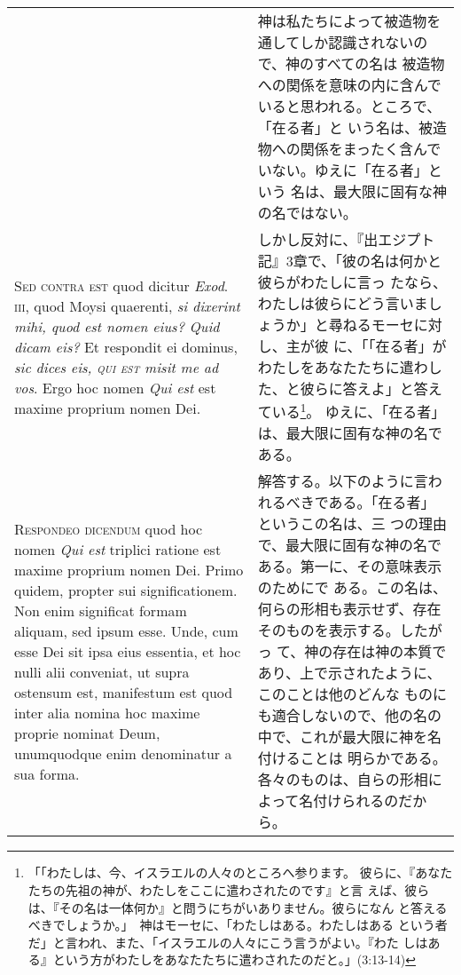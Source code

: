 \documentclass[10pt]{jsarticle}
\begin{document}
\begin{longtable}{p{21em}p{21em}}
&

神は私たちによって被造物を通してしか認識されないので、神のすべての名は
被造物への関係を意味の内に含んでいると思われる。ところで、「在る者」と
いう名は、被造物への関係をまったく含んでいない。ゆえに「在る者」という
名は、最大限に固有な神の名ではない。

\\

{\scshape Sed contra est} quod dicitur {\itshape Exod}.~{\scshape
iii}, quod Moysi quaerenti, {\itshape si dixerint mihi, quod est nomen
eius? Quid dicam eis?}  Et respondit ei dominus, {\itshape sic dices
eis, {\scshape qui est} misit me ad vos}. Ergo hoc nomen {\itshape Qui
est} est maxime proprium nomen Dei.

&

しかし反対に、『出エジプト記』3章で、「彼の名は何かと彼らがわたしに言っ
たなら、わたしは彼らにどう言いましょうか」と尋ねるモーセに対し、主が彼
に、「「在る者」がわたしをあなたたちに遣わした、と彼らに答えよ」と答え
ている\footnote{「「わたしは、今、イスラエルの人々のところへ参ります。
彼らに、『あなたたちの先祖の神が、わたしをここに遣わされたのです』と言
えば、彼らは、『その名は一体何か』と問うにちがいありません。彼らになん
と答えるべきでしょうか。」　神はモーセに、「わたしはある。わたしはある
という者だ」と言われ、また、「イスラエルの人々にこう言うがよい。『わた
しはある』という方がわたしをあなたたちに遣わされたのだと。」(3:13-14)}。
ゆえに、「在る者」は、最大限に固有な神の名である。

\\

{\scshape Respondeo dicendum} quod hoc nomen {\itshape Qui est}
triplici ratione est maxime proprium nomen Dei. Primo quidem, propter
sui significationem. Non enim significat formam aliquam, sed ipsum
esse. Unde, cum esse Dei sit ipsa eius essentia, et hoc nulli alii
conveniat, ut supra ostensum est, manifestum est quod inter alia
nomina hoc maxime proprie nominat Deum, unumquodque enim denominatur a
sua forma.

&

解答する。以下のように言われるべきである。「在る者」というこの名は、三
つの理由で、最大限に固有な神の名である。第一に、その意味表示のためにで
ある。この名は、何らの形相も表示せず、存在そのものを表示する。したがっ
て、神の存在は神の本質であり、上で示されたように、このことは他のどんな
ものにも適合しないので、他の名の中で、これが最大限に神を名付けることは
明らかである。各々のものは、自らの形相によって名付けられるのだから。

\\


\end{longtable}
\end{document}
